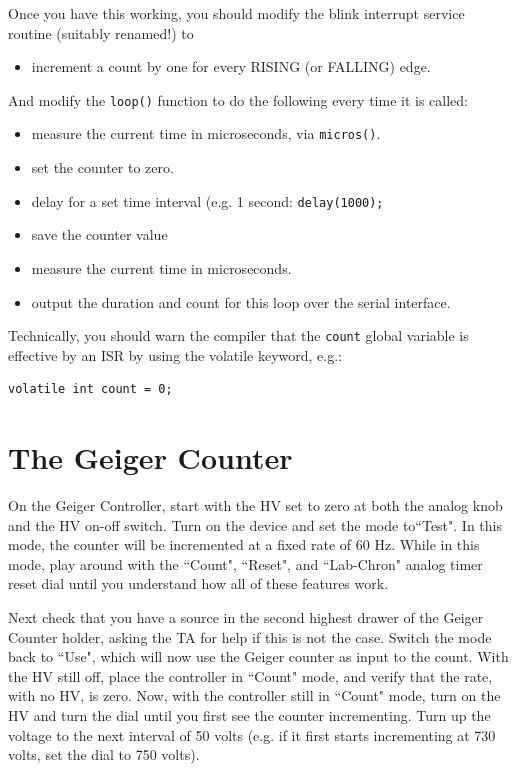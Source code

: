 \documentclass[12pt]{article}
\begin{document}
Once you have this working, you should modify the blink interrupt service routine (suitably renamed!) to
\begin{itemize}
\item increment a count by one for every RISING (or FALLING) edge.
\end{itemize}
And modify the {\tt loop()} function to do the following every time it is called:
\begin{itemize}
\item measure the current time in microseconds, via {\tt micros()}.
\item set the counter to zero.
\item delay for a set time interval (e.g. 1 second:  {\tt delay(1000); }
\item save the counter value
\item measure the current time in microseconds.
\item output the duration and count for this loop over the serial interface.
\end{itemize}
Technically, you should warn the compiler that the {\tt count} global variable is effective by an ISR by using the volatile keyword, e.g.:
\begin{verbatim}
volatile int count = 0;
\end{verbatim}

\section{The Geiger Counter}

On the Geiger Controller, start with the HV set to zero at both the analog knob and the HV on-off switch.   Turn on the device and set the mode to``Test".  In this mode, the counter will be incremented at a fixed rate of 60 Hz.   While in this mode, play around with the ``Count", ``Reset", and ``Lab-Chron" analog timer reset dial until you understand how all of these features work.

Next check that you have a source in the second highest drawer of the Geiger Counter holder, asking the TA for help if this is not the case.  Switch the mode back to ``Use", which will now use the Geiger counter as input to the count.  With the HV still off, place the controller in ``Count" mode, and verify that the rate, with no HV, is zero.  Now, with the controller still in ``Count" mode, turn on the HV and turn the dial until you first see the counter incrementing.  Turn up the voltage to the next interval of 50 volts (e.g. if it first starts incrementing at 730 volts, set the dial to 750 volts).
\end{document}
